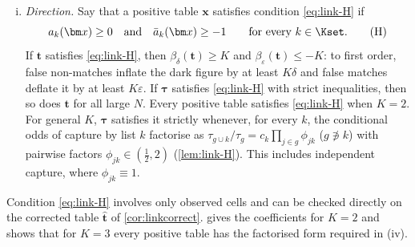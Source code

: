 \begin{theorem}
\begin{enumerate}[(i)]
\begin{align}
    \beta_\varepsilon(\bm t)=-K-\sum_{k\in\Kset}\frac{t_{\{k\}}}{C_k(\bm t)}\bigl\{1+\bar a_k(\bm t)\bigr\},\label{eq:link-betas}\\
    a_k(\bm t)&=\sum_{g\not\ni k}(-1)^{|g|+1}\frac{t_{g\cup k}}{t_g},\qquad
    \bar a_k(\bm t)=\sum_{g\not\ni k}(-1)^{|g|+1}\frac{t_g}{t_{g\cup k}},\qquad
    b_k(\bm t)=\frac{t_{k+}}{t_{\{k\}}}-1 .\notag
  \end{align}
  The coefficients are scale-free, so $\beta(\bm t)=\beta(\bm\tau_N)$, and they do not depend on $\omega$.
  \item \emph{Direction.} Say that a positive table $\bm x$ satisfies condition \eqref{eq:link-H} if
  \begin{equation}\label{eq:link-H}
    a_k(\bm x)\ge0\quad\text{and}\quad\bar a_k(\bm x)\ge-1\qquad\text{for every }k\in\Kset.\tag{H}
  \end{equation}
  If $\bm t$ satisfies \eqref{eq:link-H}, then $\beta_\delta(\bm t)\ge K$ and $\beta_\varepsilon(\bm t)\le-K$: to first order, false non-matches inflate the dark figure by at least $K\delta$ and false matches deflate it by at least $K\varepsilon$. If $\bm\tau$ satisfies \eqref{eq:link-H} with strict inequalities, then so does $\bm t$ for all large $N$. Every positive table satisfies \eqref{eq:link-H} when $K=2$. For general $K$, $\bm\tau$ satisfies it strictly whenever, for every $k$, the conditional odds of capture by list $k$ factorise as $\tau_{g\cup k}/\tau_g=c_k\prod_{j\in g}\phi_{jk}$ ($g\not\ni k$) with pairwise factors $\phi_{jk}\in(\frac12,2)$ (\cref{lem:link-H}). This includes independent capture, where $\phi_{jk}\equiv1$.
\end{enumerate}
\end{theorem}

Condition \eqref{eq:link-H} involves only observed cells and can be checked directly on the corrected table $\hat{\bm t}$ of \cref{cor:linkcorrect}.  gives the coefficients for $K=2$ and shows that for $K=3$ every positive table has the factorised form required in (iv).

